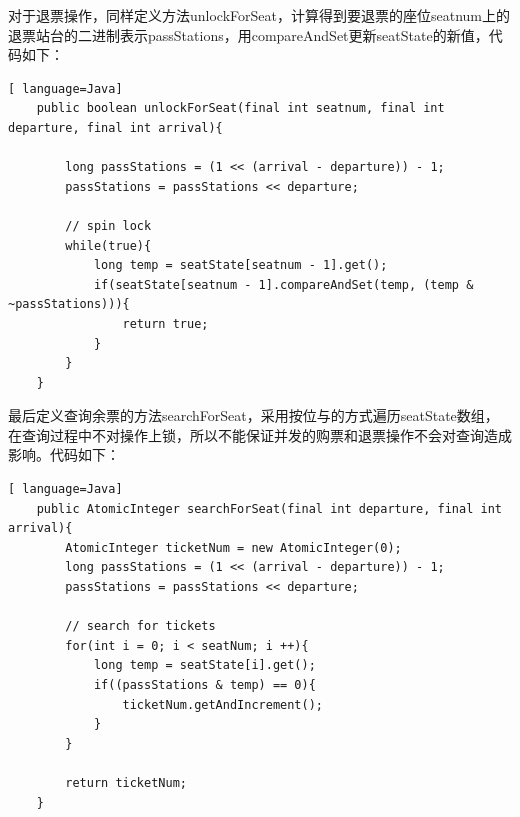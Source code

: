 \documentclass{article}
\begin{document}
对于退票操作，同样定义方法unlockForSeat，计算得到要退票的座位seatnum上的退票站台的二进制表示passStations，用compareAndSet更新seatState的新值，代码如下：\par
\begin{lstlisting}[ language=Java]
    public boolean unlockForSeat(final int seatnum, final int departure, final int arrival){

        long passStations = (1 << (arrival - departure)) - 1;
        passStations = passStations << departure;
        
        // spin lock
        while(true){
            long temp = seatState[seatnum - 1].get();
            if(seatState[seatnum - 1].compareAndSet(temp, (temp & ~passStations))){
                return true;
            }
        }
    }
\end{lstlisting}\par
最后定义查询余票的方法searchForSeat，采用按位与的方式遍历seatState数组，在查询过程中不对操作上锁，所以不能保证并发的购票和退票操作不会对查询造成影响。代码如下：\par
\begin{lstlisting}[ language=Java]
    public AtomicInteger searchForSeat(final int departure, final int arrival){
        AtomicInteger ticketNum = new AtomicInteger(0);
        long passStations = (1 << (arrival - departure)) - 1;
        passStations = passStations << departure;

        // search for tickets
        for(int i = 0; i < seatNum; i ++){
            long temp = seatState[i].get();
            if((passStations & temp) == 0){
                ticketNum.getAndIncrement();
            }
        }

        return ticketNum;
    }
\end{lstlisting}\par
\end{document}
